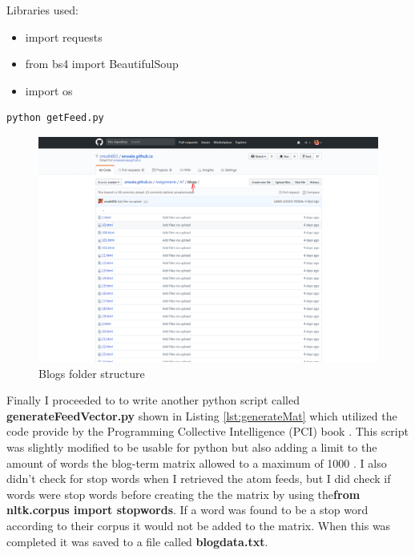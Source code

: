 \documentclass[letterpaper,11pt]{article}
\begin{document}
Libraries used:
\begin{itemize}
\item import requests
\item from bs4 import BeautifulSoup
\item import os

\end{itemize}
\begin{lstlisting}[frame=single]
python getFeed.py
\end{lstlisting}
 
 \begin{figure}[h]
 \centering
 \includegraphics[scale=0.2]{blogfolder}
 \caption{Blogs folder structure}
 \label{fig:mds}
 \end{figure}

Finally I proceeded to to write another python script called \textbf{generateFeedVector.py} shown in Listing \ref{lst:generateMat} which utilized the code provide by the Programming Collective Intelligence (PCI) book \cite{collectiveIntell}. This script was slightly modified to be usable for python  but also adding a limit to the amount of words the blog-term matrix allowed to a maximum of 1000 . I also didn't check for stop words when I retrieved the atom feeds, but I did check if words were stop words before creating the the matrix by using the\textbf{from nltk.corpus import stopwords}. If a word was found to be a stop word according to their corpus it would not be added to the matrix. When this was completed it was saved to a file called \textbf{blogdata.txt}.
\end{document}

